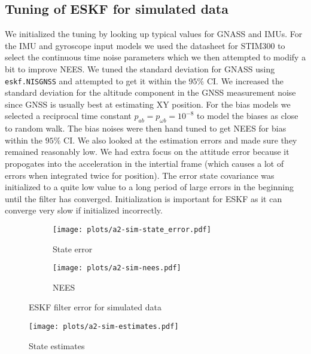 \subsection{Tuning of ESKF for simulated data}

We initialized the tuning by looking up typical values for GNASS and IMUs. For the IMU and gyroscope input models we used the datasheet for STIM300 to select the continuous time noise parameters which we then attempted to modify a bit to improve NEES. We tuned the standard deviation for GNASS using \texttt{eskf.NISGNSS} and attempted to get it within the $95\%$ CI. We increased the standard deviation for the altitude component in the GNSS measurement noise since GNSS is usually best at estimating XY position. For the bias models we selected a reciprocal time constant $p_{ab} = p_{\omega b} = 10^{-8}$ to model the biases as close to random walk. The bias noises were then hand tuned to get NEES for bias within the $95\%$ CI. We also looked at the estimation errors and made sure they remained reasonably low. We had extra focus on the attitude error because it propogates into the acceleration in the intertial frame (which causes a lot of errors when integrated twice for position). The error state covariance was initialized to a quite low value to a long period of large errors in the beginning until the filter has converged. Initialization is important for ESKF as it can  converge very slow if initialized incorrectly. 

\begin{figure}
    \centering
    \hspace*{-2cm}\begin{adjustbox}{minipage=\linewidth, scale=1}
        \begin{subfigure}{.5\textwidth}
            \texttt{[image: plots/a2-sim-state\_error.pdf]} 
            \caption{State error}
            \label{fig:a2-sim-state_error}
        \end{subfigure}
        \begin{subfigure}{.5\textwidth}
            \texttt{[image: plots/a2-sim-nees.pdf]} 
            \caption{NEES}
            \label{fig:a2-sim-nees}
        \end{subfigure}
    \end{adjustbox}
        \caption{ESKF filter error for simulated data}
        \label{fig:a2-sim-error_NEES}
\end{figure}
\begin{figure}
    \centering
    \texttt{[image: plots/a2-sim-estimates.pdf]} 
    \caption{State estimates}
    \label{fig:a2-sim-estimates}
\end{figure}

%
